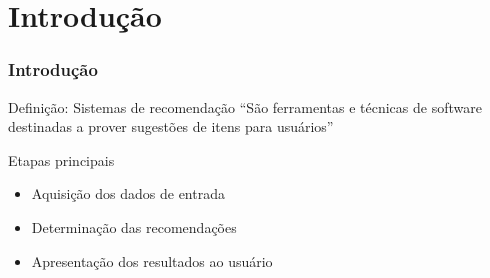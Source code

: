 \section[Introdução]{Introdução}
\begin{frame}
\frametitle{Introdução}
\begin{block}{Definição: Sistemas de recomendação}
``São ferramentas e técnicas de software destinadas a prover sugestões de itens para usuários'' \cite{ricci2011introduction-chap1}
\end{block}
\begin{block}{Etapas principais}
\begin{itemize}
	\item Aquisição dos dados de entrada
	\item Determinação das recomendações
	\item Apresentação dos resultados ao usuário
\end{itemize}
\end{block}
\end{frame}
